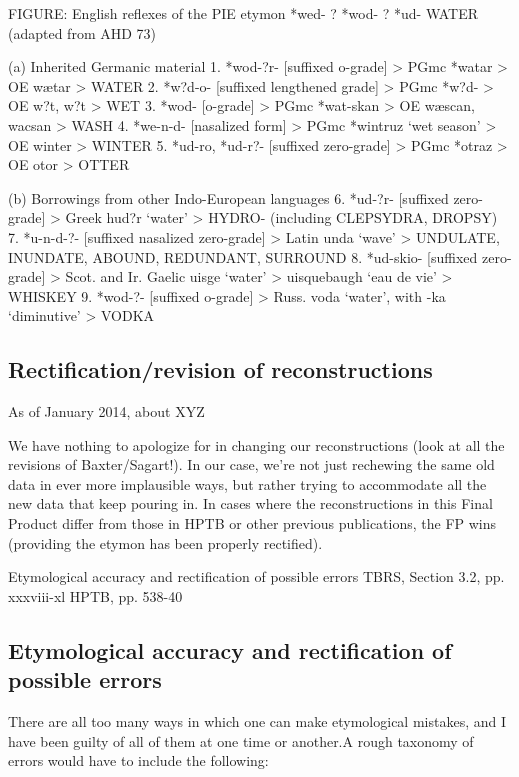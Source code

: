 	FIGURE: English reflexes of the PIE etymon  *wed- ? *wod- ? *ud- WATER (adapted from AHD 73)

 (a) Inherited Germanic material
1.  *wod-?r-	[suffixed o-grade]
	> PGmc *watar > OE wætar > WATER
2.  *w?d-o-	[suffixed lengthened grade]
	> PGmc *w?d- > OE w?t, w?t > WET
3.  *wod-	[o-grade]
	> PGmc *wat-skan > OE wæscan, wacsan > WASH
4.  *we-n-d-	[nasalized form]
	> PGmc *wintruz ‘wet season’ > OE winter > WINTER
5.  *ud-ro, *ud-r?-  [suffixed zero-grade]
	> PGmc *otraz > OE otor > OTTER

(b) Borrowings from other Indo-European languages
6.  *ud-?r-	[suffixed zero-grade]
	> Greek hud?r ‘water’ > HYDRO- (including CLEPSYDRA, DROPSY)
7.  *u-n-d-?-	[suffixed nasalized zero-grade]
	> Latin unda ‘wave’ > UNDULATE, INUNDATE, ABOUND, REDUNDANT, SURROUND
8.  *ud-skio-	[suffixed zero-grade]
	> Scot. and Ir. Gaelic uisge ‘water’ > uisquebaugh ‘eau de vie’ > WHISKEY
9.  *wod-?-	[suffixed o-grade]
	> Russ. voda ‘water’, with -ka ‘diminutive’ > VODKA
	
	
\subsection{Rectification/revision of reconstructions}

As of January 2014, about XYZ%

We have nothing to apologize for in changing our reconstructions (look at all the revisions of Baxter/Sagart!). In our case, we’re not just rechewing the same old data in ever more implausible ways, but rather trying to accommodate all the new data that keep pouring in. 
In cases where the reconstructions in this Final Product differ from those in HPTB or other previous publications, the FP wins (providing the etymon has been properly rectified).

Etymological accuracy and rectification of possible errors
	TBRS, Section 3.2, pp. xxxviii-xl
	HPTB, pp. 538-40
	
\subsection[Etymological accuracy and rectification of possible errors]{Etymological accuracy and rectification of possible errors}

There are all too many ways in which one can make etymological mistakes, and
I have been guilty of all of them at one time or another.\footnotemark A rough taxonomy of
errors would have to include the following:

